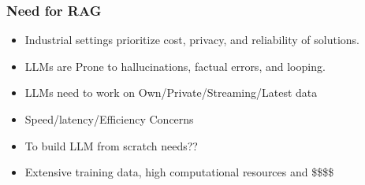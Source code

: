 \begin{frame}[fragile]\frametitle{Need for RAG}

\begin{itemize}
\item Industrial settings prioritize cost, privacy, and reliability of solutions.
\item LLMs are Prone to hallucinations, factual errors, and looping.
\item LLMs need to work on Own/Private/Streaming/Latest data
\item Speed/latency/Efficiency Concerns
\item To build LLM from scratch needs??
\item Extensive training data, high computational resources and \$\$\$\$
\end{itemize}	

\end{frame}







